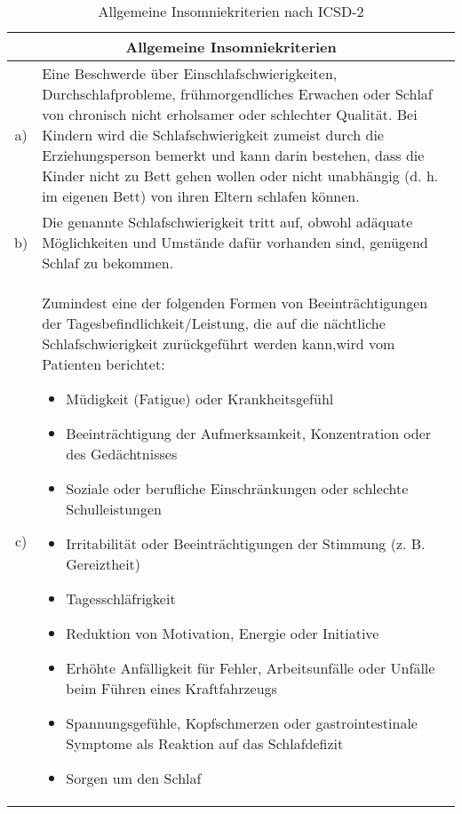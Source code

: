 \begin{table}[H] 
\centering
\begin{tabularx}{\textwidth}{cX}
\toprule
\multicolumn{2}{c}{\textbf{Allgemeine Insomniekriterien}}\\
\midrule 
a) & Eine Beschwerde über Einschlafschwierigkeiten, Durchschlafprobleme, frühmorgendliches Erwachen oder Schlaf von chronisch nicht erholsamer oder schlechter Qualität. Bei Kindern wird die Schlafschwierigkeit zumeist durch die Erziehungsperson bemerkt und kann darin bestehen, dass die Kinder nicht zu Bett gehen wollen oder nicht unabhängig (d. h. im eigenen Bett) von ihren Eltern schlafen können.\\
b) & Die genannte Schlafschwierigkeit tritt auf, obwohl adäquate Möglichkeiten und Umstände dafür vorhanden sind, genügend Schlaf zu bekommen.\\
c) & Zumindest eine der folgenden Formen von Beeinträchtigungen der Tagesbefindlichkeit/Leistung, die auf die nächtliche Schlafschwierigkeit zurückgeführt werden kann,wird vom Patienten berichtet:
\begin{itemize}
\singlespacing
\setlength\itemsep{0em}
\item Müdigkeit (Fatigue) oder Krankheitsgefühl
\item Beeinträchtigung der Aufmerksamkeit, Konzentration oder des Gedächtnisses
\item Soziale oder berufliche Einschränkungen oder schlechte Schulleistungen
\item Irritabilität oder Beeinträchtigungen der Stimmung (z. B. Gereiztheit)
\item Tagesschläfrigkeit
\item Reduktion von Motivation, Energie oder Initiative
\item Erhöhte Anfälligkeit für Fehler, Arbeitsunfälle oder Unfälle beim Führen eines Kraftfahrzeugs
\item Spannungsgefühle, Kopfschmerzen oder gastrointestinale Symptome als Reaktion auf das Schlafdefizit
\item Sorgen um den Schlaf
\end{itemize}\\
\bottomrule
\end{tabularx}
\caption[Allgemeine Insomniekriterien]{Allgemeine Insomniekriterien nach \acs{ICSD-2} \parencite{mayer_s3-leitlinie_2009}}
\label{tab:allgemeine_insomnie}
\end{table}



\newpage
\restoregeometry
{}
\renewcommand{\headrulewidth}{0.4pt}



